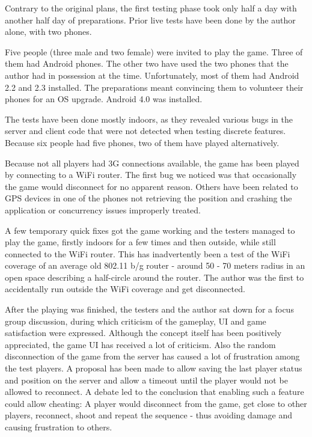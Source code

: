 Contrary to the original plans, the first testing phase took only half a day
with another half day of preparations. Prior live tests have been done by the
author alone, with two phones.\newline

Five people (three male and two female) were invited to play the game. Three of
them had Android phones. The other two have used the two phones that the author
had in possession at the time. Unfortunately, most of them had Android 2.2 and
2.3 installed. The preparations meant convincing them to volunteer their phones
for an OS upgrade. Android 4.0 was installed.\newline

The tests have been done mostly indoors, as they revealed various bugs in the
server and client code that were not detected when testing discrete features.
Because six people had five phones, two of them have played
alternatively.\newline

Because not all players had 3G connections available, the game has been played
by connecting to a WiFi router. The first bug we noticed was that occasionally
the game would disconnect for no apparent reason. Others have been related to
GPS devices in one of the phones not retrieving the position and crashing the
application or concurrency issues improperly treated.\newline

A few temporary quick fixes got the game working and the testers managed to play
the game, firstly indoors for a few times and then outside, while still
connected to the WiFi router. This has inadvertently been a test of the WiFi
coverage of an average old 802.11 b/g router - around 50 - 70 meters radius in
an open space describing a half-circle around the router. The author was the
first to accidentally run outside the WiFi coverage and get
disconnected.\newline

After the playing was finished, the testers and the author sat down for a
focus group discussion, during which criticism of the gameplay, UI and game
satisfaction were expressed. Although the concept itself has been positively
appreciated, the game UI has received a lot of criticism. Also the random
disconnection of the game from the server has caused a lot of frustration among
the test players. A proposal has been made to allow saving the last player
status and position on the server and allow a timeout until the player would not
be allowed to reconnect. A debate led to the conclusion that enabling such a
feature could allow cheating: A player would disconnect from the game, get close
to other players, reconnect, shoot and repeat the sequence - thus avoiding
damage and causing frustration to others. \newline

